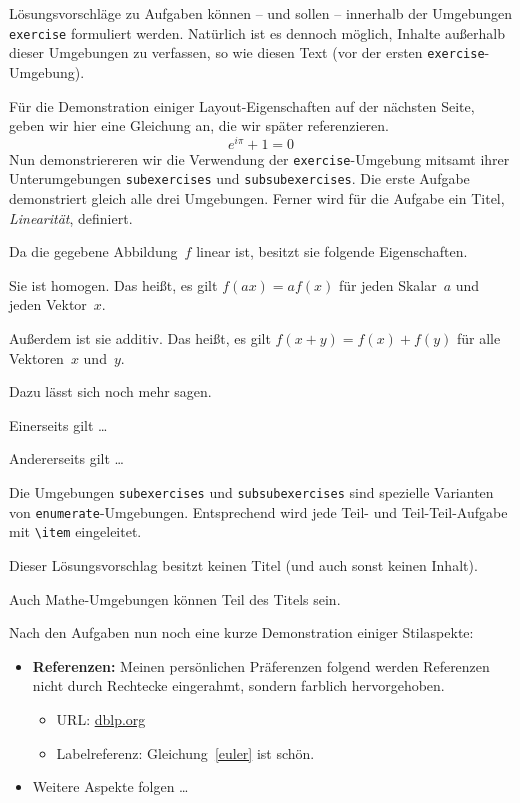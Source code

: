 \documentclass[
]{exercss}
\begin{document}
	Lösungsvorschläge zu Aufgaben können -- und sollen -- innerhalb der Umgebungen \texttt{exercise} formuliert werden. Natürlich ist es dennoch möglich, Inhalte außerhalb dieser Umgebungen zu verfassen, so wie diesen Text (vor der ersten \texttt{exercise}-Umgebung).

	Für die Demonstration einiger Layout-Eigenschaften auf der nächsten Seite, geben wir hier eine Gleichung an, die wir später referenzieren.
	\begin{equation}
		\label{euler}
		e^{i\pi} + 1 = 0
	\end{equation}
	Nun demonstriereren wir die Verwendung der \texttt{exercise}-Umgebung mitsamt ihrer Unterumgebungen \texttt{subexercises} und \texttt{subsubexercises}. Die erste Aufgabe demonstriert gleich alle drei Umgebungen. Ferner wird für die Aufgabe ein Titel, \emph{Linearität}, definiert.
	\begin{exercise}[title=Linearität]
		Da die gegebene Abbildung~$f$ linear ist, besitzt sie folgende Eigenschaften.
		\begin{subexercises}
		\item Sie ist homogen. Das heißt, es gilt $f(ax) = af(x)$ für jeden Skalar~$a$ und jeden Vektor~$x$.
		\item Außerdem ist sie additiv. Das heißt, es gilt $f(x+y) = f(x) + f(y)$ für alle Vektoren~$x$ und~$y$.

			Dazu lässt sich noch mehr sagen.
			\begin{subsubexercises}
			\item Einerseits gilt \dots
			\item Andererseits gilt \dots
			\end{subsubexercises}
		\end{subexercises}
	\end{exercise}
	Die Umgebungen \texttt{subexercises} und \texttt{subsubexercises} sind spezielle Varianten von \texttt{enumerate}-Umgebungen. Entsprechend wird jede Teil- und Teil-Teil-Aufgabe mit \verb+\item+ eingeleitet.
	\begin{exercise}
		Dieser Lösungsvorschlag besitzt keinen Titel (und auch sonst keinen Inhalt).
	\end{exercise}
	\begin{exercise}[title={$\log(e^x) = x$}]
		Auch Mathe-Umgebungen können Teil des Titels sein.
	\end{exercise}
	Nach den Aufgaben nun noch eine kurze Demonstration einiger Stilaspekte:
	\begin{itemize}
		\item \textbf{Referenzen:} Meinen persönlichen Präferenzen folgend werden Referenzen nicht durch Rechtecke eingerahmt, sondern farblich hervorgehoben.
			\begin{itemize}
				\item URL: \url{dblp.org}
				\item Labelreferenz: Gleichung~\eqref{euler} ist schön.
			\end{itemize}
		\item Weitere Aspekte folgen \dots
	\end{itemize}
\end{document}
